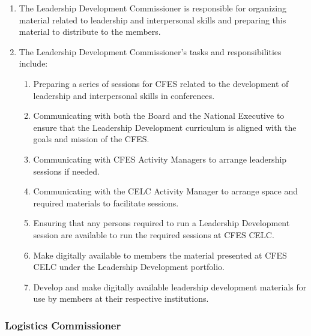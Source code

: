 \begin{enumerate}
 \item
  The Leadership Development Commissioner is responsible for organizing material related to leadership and interpersonal skills and preparing this material to distribute to the members.
 \item
  The Leadership Development Commissioner’s tasks and responsibilities include:

  \begin{enumerate}
   \item
    Preparing a series of sessions for CFES related to the development of leadership and interpersonal skills in conferences.
   \item
    Communicating with both the Board and the National Executive to ensure that the Leadership Development curriculum is aligned with the goals and mission of the CFES.
   \item
    Communicating with CFES Activity Managers to arrange leadership sessions if needed.
   \item
    Communicating with the CELC Activity Manager to arrange space and required materials to facilitate sessions.
   \item
    Ensuring that any persons required to run a Leadership Development session are available to run the required sessions at CFES CELC.
   \item
    Make digitally available to members the material presented at CFES CELC under the Leadership Development portfolio.
   \item
    Develop and make digitally available leadership development materials for use by members at their respective institutions.
  \end{enumerate}
\end{enumerate}

\subsubsection{Logistics Commissioner}
\label{logistics-commissioner}

